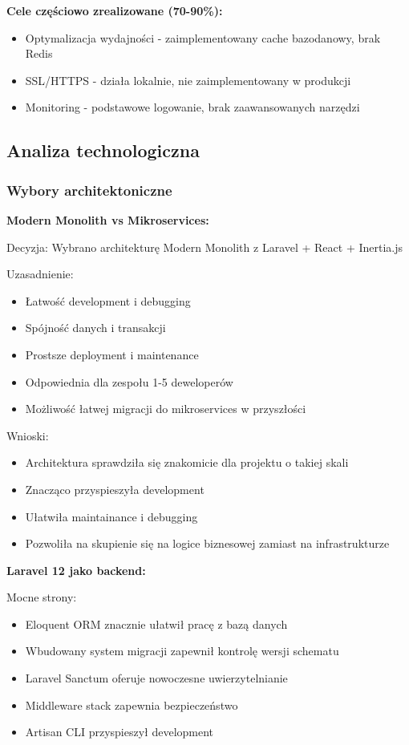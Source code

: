 \documentclass[12pt,a4paper]{article}
\begin{document}
    \textbf{Cele częściowo zrealizowane (70-90\%):}
    \begin{itemize}
        \item Optymalizacja wydajności - zaimplementowany cache bazodanowy, brak Redis
        \item SSL/HTTPS - działa lokalnie, nie zaimplementowany w produkcji
        \item Monitoring - podstawowe logowanie, brak zaawansowanych narzędzi
    \end{itemize}

    \subsection{Analiza technologiczna}

    \subsubsection{Wybory architektoniczne}

    \textbf{Modern Monolith vs Mikroservices:}

    Decyzja: Wybrano architekturę Modern Monolith z Laravel + React + Inertia.js

    Uzasadnienie:
    \begin{itemize}
        \item Łatwość development i debugging
        \item Spójność danych i transakcji
        \item Prostsze deployment i maintenance
        \item Odpowiednia dla zespołu 1-5 deweloperów
        \item Możliwość łatwej migracji do mikroservices w przyszłości
    \end{itemize}

    Wnioski:
    \begin{itemize}
        \item Architektura sprawdziła się znakomicie dla projektu o takiej skali
        \item Znacząco przyspieszyła development
        \item Ułatwiła maintainance i debugging
        \item Pozwoliła na skupienie się na logice biznesowej zamiast na infrastrukturze
    \end{itemize}

    \textbf{Laravel 12 jako backend:}

    Mocne strony:
    \begin{itemize}
        \item Eloquent ORM znacznie ułatwił pracę z bazą danych
        \item Wbudowany system migracji zapewnił kontrolę wersji schematu
        \item Laravel Sanctum oferuje nowoczesne uwierzytelnianie
        \item Middleware stack zapewnia bezpieczeństwo
        \item Artisan CLI przyspieszył development
    \end{itemize}
\end{document}
